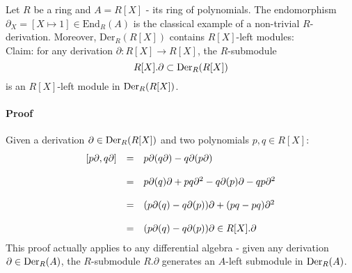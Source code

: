 \bsp Let $R$ be a ring and $A = R[X]$ - its ring of polynomials. The endomorphism $\partial_X = [X \longmapsto 1] \in \mathrm{End}_R(A)$ is the classical example of a non-trivial $R$-derivation. Moreover, $\mathrm{Der}_R(R[X])$ contains $R[X]$-left modules:\\
\indent Claim: for any derivation $\partial : R[X] \longrightarrow R[X]$, the $R$-submodule
$$R[X].\partial \subset \der{R[X]}$$
is an $R[X]$-left module in $\der{R[X]}$.
\paragraph{Proof} Given a derivation $\partial \in \der{R[X]}$ and two polynomials $p, q \in R[X]$:
$$\bao{rcl}
[p \partial,q \partial] &=& p \partial(q \partial) - q \partial(p \partial)\\&&\\ &=& p \partial(q) \partial + p q \partial^2 - q \partial(p) \partial - q p \partial^2\\
&&\\
&=& (p \partial(q) - q \partial(p)) \partial + (p q - p q) \partial^2\\
&&\\
&=& (p \partial(q) - q \partial(p)) \partial \in R[X].\partial\\
\ea$$
\bmk This proof actually applies to any differential algebra - given any derivation $\partial \in \dera$, the $R$-submodule $R . \partial$ generates an $A$-left submodule in $\dera$.
\begin{defi}

\end{defi}
